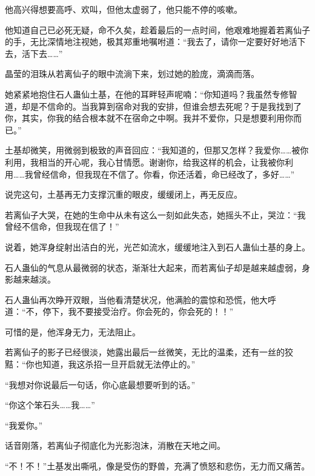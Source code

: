\begin{this_body}
他高兴得想要高呼、欢叫，但他太虚弱了，他只能不停的咳嗽。

他知道自己已必死无疑，命不久矣，趁着最后的一点时间，他艰难地握着若离仙子的手，无比深情地注视她，极其郑重地嘱咐道：“我去了，请你一定要好好地活下去，活下去……”

晶莹的泪珠从若离仙子的眼中流淌下来，划过她的脸庞，滴滴而落。

她紧紧地抱住石人蛊仙土基，在他的耳畔轻声呢喃：“你知道吗？我虽然专修智道，却是不信命的。当我算到宿命对我的安排，但谁会想去死呢？于是我找到了你，其实，你我的结合根本就不在宿命之中啊。我并不爱你，只是想要利用你而已。”

土基却微笑，用微弱到极致的声音回应：“我知道的，但那又怎样？我爱你……被你利用，我相当的开心呢，我心甘情愿。谢谢你，给我这样的机会，让我被你利用……我曾经信命，但我现在不信了。你看，你还活着，命已经改了，多好……”

说完这句，土基再无力支撑沉重的眼皮，缓缓闭上，再无反应。

若离仙子大哭，在她的生命中从未有这么一刻如此失态，她摇头不止，哭泣：“我曾经不信命，但我现在信了！”

说着，她浑身绽射出洁白的光，光芒如流水，缓缓地注入到石人蛊仙土基的身上。

石人蛊仙的气息从最微弱的状态，渐渐壮大起来，而若离仙子却是越来越虚弱，身影越来越淡。

石人蛊仙再次睁开双眼，当他看清楚状况，他满脸的震惊和恐慌，他大呼道：“不，停下，我不要接受治疗。你会死的，你会死的！！”

可惜的是，他浑身无力，无法阻止。

若离仙子的影子已经很淡，她露出最后一丝微笑，无比的温柔，还有一丝的狡黠：“你也知道，我这杀招一旦开启就无法停止的。”

“我想对你说最后一句话，你心底最想要听到的话。”

“你这个笨石头……我……”

“我爱你。”

话音刚落，若离仙子彻底化为光影泡沫，消散在天地之间。

“不！不！”土基发出嘶吼，像是受伤的野兽，充满了愤怒和悲伤，无力而又痛苦。

\end{this_body}

